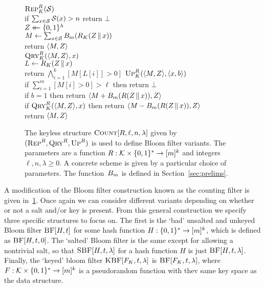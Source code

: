 \begin{figure}
  {
    \underline{$\textnormal{\textsc{Rep}}^R_K(\mathcal{S})$}\\[2pt]
      if $\sum_{x \in \mathcal{S}} \mathcal{S}(x) > n$ return $\bot$\\
      $Z \mathrel{\leftarrow\mkern-14mu\leftarrow} \{0,1\}^\lambda$\\
      $M \gets \sum_{x \in \mathcal{S}} {B}_m(R_K(Z \, \| \, x))$\\
      return $\langle M, Z \rangle$
    \\[6pt]
      \underline{$\textnormal{\textsc{Qry}}^R_K(\langle M, Z \rangle,x)$}\\[2pt]
      $L \gets R_K(Z \, \| \, x)$\\
      return $\bigwedge_{i=1}^k [M[L[i]] > 0]$
  }
  {
    \underline{$\textnormal{\textsc{Up}}^R_K(\langle M, Z \rangle,\langle x, b \rangle)$}\\[2pt]
      if $\sum_{i=1}^m [M[i] > 0] > \ell$ then return $\bot$\\
      if $b = 1$ then return $\langle M + {B}_m(R(Z \, \| \, x)), Z \rangle$\\
      if $\textnormal{\textsc{Qry}}^R_K(\langle M, Z \rangle, x)$ then return $\langle M - {B}_m(R(Z \, \| \, x)), Z \rangle$\\
      return $\langle M, Z \rangle$
  }
  \caption{The keyless structure $\textnormal{\textsc{Count}}[R,\ell,n,\lambda]$ given by
  $(\textnormal{\textsc{Rep}}^R,\textnormal{\textsc{Qry}}^R,\textnormal{\textsc{Up}}^R)$ is used to define Bloom filter variants. The
  parameters are a function $R: \mathcal{K}\times\{0,1\}^* \to [m]^k$ and integers $\ell, n,
  \lambda \geq0$. A concrete scheme is given by a particular choice of
  parameters.  The function~${B}_m$ is defined in
  Section~\ref{sec:prelims}.}
  \label{fig:cbf-def}
\end{figure}

A modification of the Bloom filter construction known as the counting filter is given in~\ref{fig:cbf-def}. Once again we can consider different variants depending on whether or not a salt and/or key is present. From this
general construction we specify three specific structures to focus on. The first
is the `bad' unsalted and unkeyed Bloom filter $\textnormal{\textsc{BF}}[H,t]$ for some hash
function $H: \{0,1\}^* \to [m]^k$, which is defined as $\textnormal{\textsc{BF}}[H,t,0]$. The `salted'
Bloom filter is the same except for allowing a nontrivial salt, so that
$\textnormal{\textsc{SBF}}[H,t,\lambda]$ for a hash function $H$ is just $\textnormal{\textsc{BF}}[H,t,\lambda]$. Finally,
the `keyed' bloom filter $\textnormal{\textsc{KBF}}[F_K,t,\lambda]$ is $\textnormal{\textsc{BF}}[F_K,t,\lambda]$, where
$F: \mathcal{K} \times \{0,1\}^* \to [m]^k$ is a pseudorandom function with thev same key space as the data structure.

